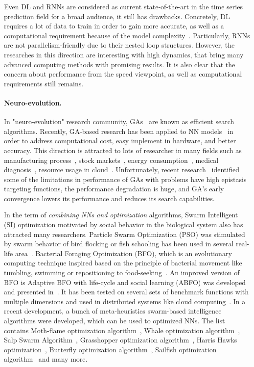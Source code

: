 \documentclass[11pt,twoside]{article}
\begin{document}
\begin{multicols}{2}
Even DL and RNNs are considered as current state-of-the-art in the time series prediction field for a broad audience, it still has drawbacks. Concretely, DL requires a lot of data to train in order to gain more accurate, as well as a computational requirement because of the model complexity~\citep{ref_hardware, ref_time, nguyen2018heuristics}. Particularly, RNNs are not parallelism-friendly due to their nested loop structures.
However, the researches in this direction are interesting with high dynamics, that bring many advanced computing methods with promising results. It is also clear that the concern about performance from the speed viewpoint, as well as computational requirements still remains.

\paragraph{Neuro-evolution.} In "neuro-evolution" research community, GAs~\citep{ref_holland} are known as efficient search algorithms. Recently, GA-based research has been applied to NN models~\citep{ref_montana, ref_whitley} in order to address computational cost, easy implement in hardware, and better accuracy. This direction is attracted to lots of researcher in many fields such as manufacturing process~\citep{ref_cook}, stock markets~\citep{ref_kim}, energy consumption~\citep{ref_magnier}, medical diagnosis~\citep{ref_karegowda}, resource usage in cloud~\citep{ref_thieu}. Unfortunately, recent research~\citep{ref_ramesh} identified some of the limitations in performance of GAs with problems have high epistasis targeting functions, the performance degradation is huge, and GA's early convergence lowers its performance and reduces its search capabilities. 

In the term of \textit{combining NNs and optimization} algorithms, Swarm Intelligent (SI) optimization motivated by social behavior in the biological system also has attracted many researchers. Particle Swarm Optimization (PSO) was stimulated by swarm behavior of bird flocking or fish schooling has been used in several real-life area~\citep{ref_kennedy2011}. Bacterial Foraging Optimization (BFO), which is an evolutionary computing technique inspired based on the principle of bacterial movement like tumbling, swimming or repositioning to food-seeking~\citep{ref_passino2002}. An improved version of BFO is Adaptive BFO with life-cycle and social learning (ABFO) was developed and presented in~\citep{ref_yan2012}. It has been tested on several sets of benchmark functions with multiple dimensions and used in distributed systems like cloud computing~\citep{nguyen2019building}. 
In a recent development, a bunch of meta-heuristics swarm-based intelligence algorithms were developed, which can be used to optimized NNs. The list contains Moth-flame optimization algorithm~\citep{mirjalili2015moth}, Whale optimization algorithm~\citep{mirjalili2016whale}, Salp Swarm Algorithm~\citep{mirjalili2017salp}, Grasshopper optimization algorithm~\citep{saremi2017grasshopper}, Harris Hawks optimization~\citep{heidari2019harris}, Butterfly optimization algorithm~\citep{arora2019butterfly}, Sailfish optimization algorithm~\citep{shadravan2019sailfish} and many more.


\end{multicols}
\end{document}
